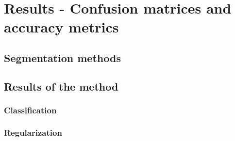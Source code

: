 
\chapter{Results - Confusion matrices and accuracy metrics} %

\label{AppendixC} %

\startcontents[chapters]
\Mprintcontents

\section{Segmentation methods}






\section{Results of the method}
\subsection{Classification}
\subsection{Regularization}

\stopcontents[chapters]
